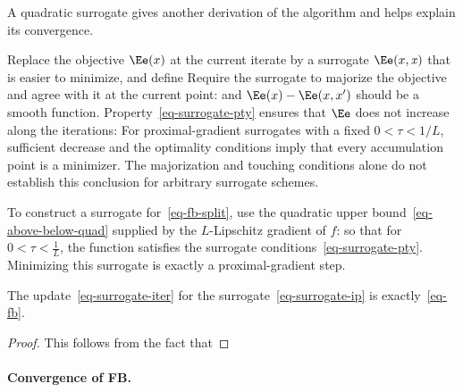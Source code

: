 A quadratic surrogate gives another derivation of the algorithm and helps explain its convergence.

%

Replace the objective $\Ee(x)$ at the current iterate by a surrogate $\Ee(x,\it{x})$ that is easier to minimize, and define
Require the surrogate to majorize the objective and agree with it at the current point:
and $\Ee(x)-\Ee(x,x')$ should be a smooth function.
%
Property~\eqref{eq-surrogate-pty} ensures that $\Ee$ does not increase along the iterations:
For proximal-gradient surrogates with a fixed $0<\tau<1/L$, sufficient decrease and the optimality conditions imply that every accumulation point is a minimizer. The majorization and touching conditions alone do not establish this conclusion for arbitrary surrogate schemes.

To construct a surrogate for~\eqref{eq-fb-split}, use the quadratic upper bound~\eqref{eq-above-below-quad} supplied by the $L$-Lipschitz gradient of $f$:
so that for $0 < \tau < \frac{1}{L}$, the function 
satisfies the surrogate conditions~\eqref{eq-surrogate-pty}.
%
Minimizing this surrogate is exactly a proximal-gradient step.

\begin{prop}
	The update~\eqref{eq-surrogate-iter} for the surrogate~\eqref{eq-surrogate-ip} is exactly~\eqref{eq-fb}.
\end{prop}
\begin{proof}
	This follows from the fact that
\end{proof}

\paragraph{Convergence of FB. }

